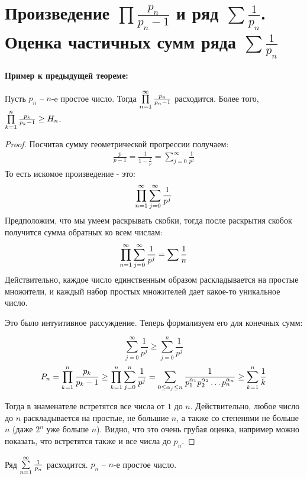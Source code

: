 \section{Произведение $\prod \frac{p_n}{p_n - 1}$ и ряд $\sum \frac{1}{p_n}$. Оценка частичных сумм ряда $\sum \frac{1}{p_n}$}
\textbf{Пример к предыдущей теореме:}

Пусть $p_n$ -- $n$-e простое число. Тогда $\prod \limits_{n=1}^\infty \frac{p_n}{p_n - 1}$ расходится.
Более того, $\prod \limits_{k=1}^n \frac{p_k}{p_k - 1} \geq H_n$.

\begin{proof}
    Посчитав сумму геометрической прогрессии получаем:
    \begin{gather*}
        \frac{p}{p-1} = \frac{1}{1-\frac{1}{p}} = \sum \limits_{j=0}^\infty \frac{1}{p^j}
    \end{gather*}
    То есть искомое произведение - это:
    \begin{gather*}
        \prod \limits_{n=1}^\infty \sum \limits_{j=0}^\infty \frac{1}{p^j}
    \end{gather*}
    Предположим, что мы умеем раскрывать скобки, тогда после раскрытия скобок получится сумма обратных ко всем числам:
    \begin{gather*}
        \prod \limits_{n=1}^\infty \sum \limits_{j=0}^\infty \frac{1}{p^j} = \sum \frac{1}{n}
    \end{gather*}
    Действительно, каждое число единственным образом раскладывается на простые множители, и каждый набор простых множителей дает какое-то уникальное число.

    Это было интуитивное рассуждение. Теперь формализуем его для конечных сумм:

    \[\sum \limits_{j=0}^\infty \frac{1}{p^j} \geq \sum \limits_{j=0}^n \frac{1}{p^j}\]
    \[P_n = \prod \limits_{k=1}^n \frac{p_k}{p_k - 1} \geq \prod \limits_{k=1}^n \sum \limits_{j=0}^n \frac{1}{p^j} = 
    \sum_{0 \leq \alpha_j \leq n} \frac{1}{p_1^{\alpha_1}p_2^{\alpha_2}\ldots p_n^{\alpha_n}} \geq \sum \limits_{k=1}^n \frac{1}{k} \]

    Тогда в знаменателе встретятся все числа от $1$ до $n$. Действительно, любое число до $n$ раскладывается на простые,
    не большие $n$, а также со степенями не больше $n$ (даже $2^n$ уже больше $n$). Видно, что это очень грубая оценка, например можно
    показать, что встретятся также и все числа до $p_n$.
\end{proof}

\begin{theorem}
    Ряд $\sum \limits_{n=1}^\infty \frac{1}{p_n}$ расходится. $p_n$ -- $n$-е простое число.
\end{theorem}

